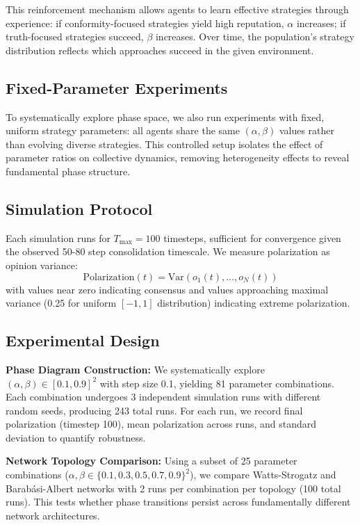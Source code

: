 \documentclass[11pt,a4paper]{article}
\begin{document}
This reinforcement mechanism allows agents to learn effective strategies through experience: if conformity-focused strategies yield high reputation, $\alpha$ increases; if truth-focused strategies succeed, $\beta$ increases. Over time, the population's strategy distribution reflects which approaches succeed in the given environment.

\subsection{Fixed-Parameter Experiments}

To systematically explore phase space, we also run experiments with fixed, uniform strategy parameters: all agents share the same $(\alpha, \beta)$ values rather than evolving diverse strategies. This controlled setup isolates the effect of parameter ratios on collective dynamics, removing heterogeneity effects to reveal fundamental phase structure.

\subsection{Simulation Protocol}

Each simulation runs for $T_{\max} = 100$ timesteps, sufficient for convergence given the observed 50-80 step consolidation timescale. We measure polarization as opinion variance:
\begin{equation}
\text{Polarization}(t) = \text{Var}(o_1(t), \ldots, o_N(t))
\end{equation}
with values near zero indicating consensus and values approaching maximal variance (0.25 for uniform $[-1,1]$ distribution) indicating extreme polarization.

\subsection{Experimental Design}

\textbf{Phase Diagram Construction:} We systematically explore $(\alpha, \beta) \in [0.1, 0.9]^2$ with step size 0.1, yielding 81 parameter combinations. Each combination undergoes 3 independent simulation runs with different random seeds, producing 243 total runs. For each run, we record final polarization (timestep 100), mean polarization across runs, and standard deviation to quantify robustness.

\textbf{Network Topology Comparison:} Using a subset of 25 parameter combinations ($\alpha, \beta \in \{0.1, 0.3, 0.5, 0.7, 0.9\}^2$), we compare Watts-Strogatz and Barabási-Albert networks with 2 runs per combination per topology (100 total runs). This tests whether phase transitions persist across fundamentally different network architectures.
\end{document}
